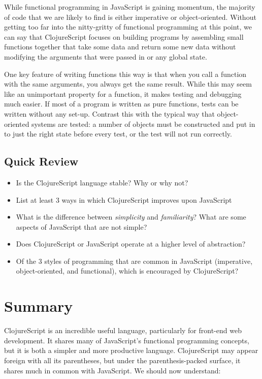 \documentclass[10pt,twoside,openright]{memoir}
\begin{document}
While functional programming in JavaScript is gaining momentum, the
majority of code that we are likely to find is either imperative or
object-oriented. Without getting too far into the nitty-gritty of
functional programming at this point, we can say that ClojureScript
focuses on building programs by assembling small functions together that
take some data and return some new data without modifying the arguments
that were passed in or any global state.

One key feature of writing functions this way is that when you call a
function with the same arguments, you always get the same result. While
this may seem like an unimportant property for a function, it makes
testing and debugging much easier. If most of a program is written as
pure functions, tests can be written without any set-up. Contrast this
with the typical way that object-oriented systems are tested: a number
of objects must be constructed and put in to just the right state before
every test, or the test will not run correctly.

\subsection{Quick Review}

\begin{itemize}
\tightlist
\item
  Is the ClojureScript language stable? Why or why not?
\item
  List at least 3 ways in which ClojureScript improves upon JavaScript
\item
  What is the difference between \emph{simplicity} and
  \emph{familiarity}? What are some aspects of JavaScript that are not
  simple?
\item
  Does ClojureScript or JavaScript operate at a higher level of
  abstraction?
\item
  Of the 3 styles of programming that are common in JavaScript
  (imperative, object-oriented, and functional), which is encouraged by
  ClojureScript?
\end{itemize}

\section{Summary}

ClojureScript is an incredible useful language, particularly for
front-end web development. It shares many of JavaScript's functional
programming concepts, but it is both a simpler and more productive
language. ClojureScript may appear foreign with all its parentheses, but
under the parenthesis-packed surface, it shares much in common with
JavaScript. We should now understand:
\end{document}
